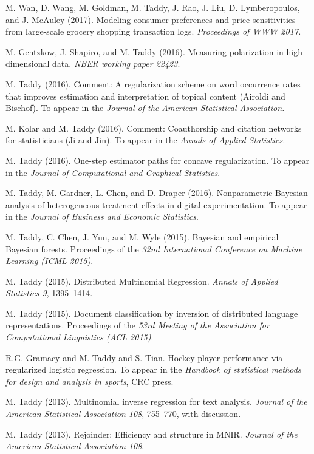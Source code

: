 \documentclass[margin,line]{res}
\begin{document}
\begin{resume}
M. Wan, D. Wang, M. Goldman, M. Taddy, J. Rao, J. Liu, D. Lymberopoulos, and J. McAuley (2017).  Modeling consumer preferences and price sensitivities from large-scale grocery shopping transaction logs. {\it Proceedings of WWW 2017.}

M. Gentzkow, J. Shapiro, and M. Taddy (2016).  Measuring polarization in high dimensional data. {\em NBER working paper 22423}.

M. Taddy (2016). Comment: A regularization scheme on word occurrence rates that improves estimation and interpretation of topical content (Airoldi and Bischof). To appear in the {\it Journal of the American Statistical Association.} 

M. Kolar and M. Taddy (2016).  Comment: Coauthorship and citation networks for statisticians (Ji and Jin). To appear in the {\it Annals of Applied Statistics. }


M. Taddy (2016). One-step estimator paths for concave regularization.  To appear in the {\em Journal of Computational and Graphical Statistics}.

M. Taddy, M. Gardner, L. Chen, and D. Draper (2016).  Nonparametric Bayesian analysis of heterogeneous treatment effects in digital experimentation.  To appear in the {\em Journal of Business and Economic Statistics}.

M. Taddy, C. Chen, J. Yun, and M. Wyle (2015). Bayesian and empirical Bayesian forests.  Proceedings of the {\em 32nd International Conference on Machine Learning (ICML 2015)}.

M. Taddy (2015). Distributed Multinomial Regression.  {\em Annals of Applied Statistics 9}, 1395--1414.

M. Taddy (2015). Document classification by inversion of distributed language representations. Proceedings of the {\em 53rd Meeting of the Association for Computational Linguistics (ACL 2015)}.

R.G. Gramacy and M. Taddy and S. Tian.  Hockey player performance via regularized logistic regression.
To appear in the {\it Handbook of statistical methods for design and analysis in sports}, CRC press.


M. Taddy (2013).  Multinomial inverse regression for text analysis.  
{\it Journal of the American Statistical
  Association 108}, 755--770, with discussion.

M. Taddy (2013).   Rejoinder: Efficiency and structure in MNIR.  {\it Journal of the American Statistical
  Association 108}.





\end{resume}
\end{document}
